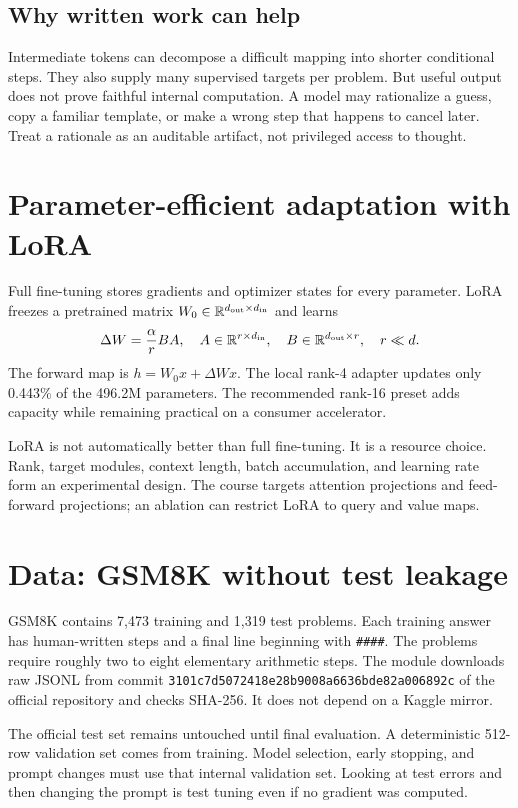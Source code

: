 \documentclass[11pt]{article}
\begin{document}
\subsection{Why written work can help}
Intermediate tokens can decompose a difficult mapping into shorter conditional
steps. They also supply many supervised targets per problem. But useful output
does not prove faithful internal computation. A model may rationalize a guess,
copy a familiar template, or make a wrong step that happens to cancel later.
Treat a rationale as an auditable artifact, not privileged access to thought.

\section{Parameter-efficient adaptation with LoRA}
Full fine-tuning stores gradients and optimizer states for every parameter. LoRA
freezes a pretrained matrix $W_0\in\mathbb R^{d_{\rm out}\times d_{\rm in}}$ and
learns
\[
\Delta W=\frac{\alpha}{r}BA,
\quad A\in\mathbb R^{r\times d_{\rm in}},\quad
B\in\mathbb R^{d_{\rm out}\times r},\quad r\ll d.
\]
The forward map is $h=W_0x+\Delta Wx$. The local rank-4 adapter updates only
0.443\% of the 496.2M parameters. The recommended rank-16 preset adds capacity
while remaining practical on a consumer accelerator.

LoRA is not automatically better than full fine-tuning. It is a resource choice.
Rank, target modules, context length, batch accumulation, and learning rate form
an experimental design. The course targets attention projections and feed-forward
projections; an ablation can restrict LoRA to query and value maps.

\section{Data: GSM8K without test leakage}
GSM8K contains 7,473 training and 1,319 test problems. Each training answer has
human-written steps and a final line beginning with \texttt{\#\#\#\#}. The
problems require roughly two to eight elementary arithmetic steps. The module
downloads raw JSONL from commit
\texttt{3101c7d5072418e28b9008a6636bde82a006892c} of the official repository
and checks SHA-256. It does not depend on a Kaggle mirror.

The official test set remains untouched until final evaluation. A deterministic
512-row validation set comes from training. Model selection, early stopping, and
prompt changes must use that internal validation set. Looking at test errors and
then changing the prompt is test tuning even if no gradient was computed.
\end{document}
